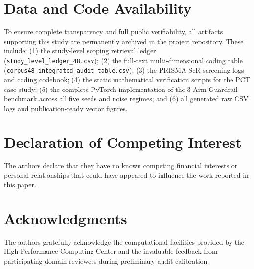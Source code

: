 \documentclass[preprint,3p,times]{elsarticle}
\begin{document}
\section*{Data and Code Availability}
To ensure complete transparency and full public verifiability, all artifacts supporting this study are permanently archived in the project repository. These include: (1) the study-level scoping retrieval ledger (\texttt{study\_level\_ledger\_48.csv}); (2) the full-text multi-dimensional coding table (\texttt{corpus48\_integrated\_audit\_table.csv}); (3) the PRISMA-ScR screening logs and coding codebook; (4) the static mathematical verification scripts for the PCT case study; (5) the complete PyTorch implementation of the 3-Arm Guardrail benchmark across all five seeds and noise regimes; and (6) all generated raw CSV logs and publication-ready vector figures.

\section*{Declaration of Competing Interest}
The authors declare that they have no known competing financial interests or personal relationships that could have appeared to influence the work reported in this paper.

\section*{Acknowledgments}
The authors gratefully acknowledge the computational facilities provided by the High Performance Computing Center and the invaluable feedback from participating domain reviewers during preliminary audit calibration.


\end{document}
